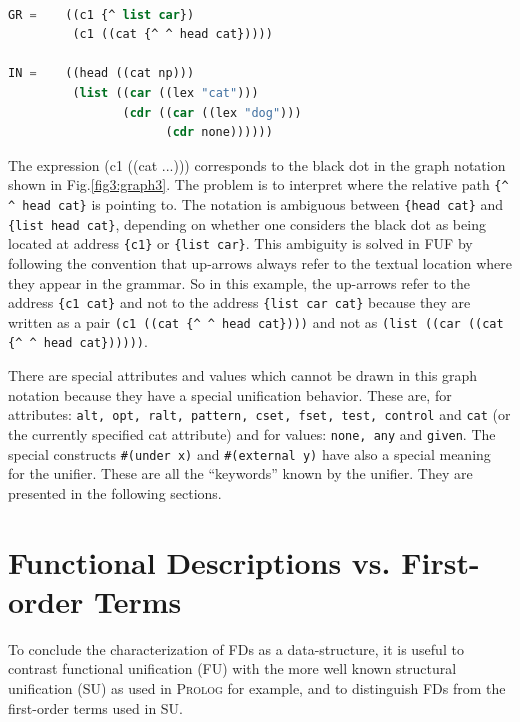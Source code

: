 \documentclass[10pt,a4paper]{report}
\begin{document}
\begin{lstlisting}[language=Lisp]

GR =	((c1 {^ list car})
	     (c1 ((cat {^ ^ head cat}))))

IN =	((head ((cat np)))
		 (list ((car ((lex "cat")))
				(cdr ((car ((lex "dog")))
					  (cdr none))))))

\end{lstlisting}

The expression (c1 ((cat ...))) corresponds to the black dot in the graph notation
shown in Fig.\ref{fig3:graph3}.  The problem is to interpret where the
relative path {\tt \{\^{} \^{} head cat\}} is pointing to.  The notation is ambiguous
between {\tt \{head cat\}} and {\tt \{list head cat\}}, depending on whether one
considers the black dot as being located at address {\tt \{c1\}} or {\tt \{list
car\}}.  This ambiguity is solved in FUF by following the convention that
up-arrows always refer to the textual location where they appear in the
grammar.  So in this example, the up-arrows refer to the address {\tt \{c1
cat\}} and not to the address {\tt \{list car cat\}} because they are written as
a pair {\tt (c1 ((cat \{\^{} \^{} head cat\})))} and not as {\tt (list ((car ((cat \{\^{} \^{}
head cat\})))))}.

There are special attributes and values which cannot be drawn in this graph
notation because they have a special unification behavior.  These are, for
attributes: {\tt alt, opt, ralt, pattern, cset, fset, test, control} and
{\tt cat} (or the currently specified cat attribute) and for values:
{\tt none, any} and {\tt given}.  The special constructs {\tt \#(under x)} and
{\tt \#(external y)} have also a special meaning for the unifier.  These are
all the ``keywords'' known by the unifier.  They are presented in the
following sections.


\section{Functional Descriptions vs. First-order Terms}

To conclude the characterization of FDs as a data-structure, it is useful
to contrast functional unification (FU) with the more well known structural
unification (SU) as used in \textsc{Prolog} for example, and to distinguish FDs
from the first-order terms used in SU.
\end{document}

